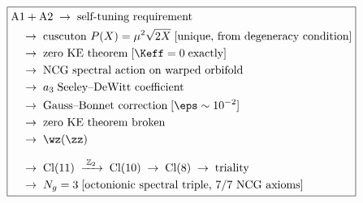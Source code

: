 %

\begin{equation}
\label{eq:1-chain-final}
\boxed{
\begin{aligned}
&\mathrm{A1 + A2} \;\to\; \text{self-tuning requirement} \\
&\quad\to\; \text{cuscuton } P(X) = \mu^2\sqrt{2X}\; [\text{unique, from degeneracy condition}] \\
&\quad\to\; \text{zero KE theorem}\; [\Keff = 0\;\text{exactly}] \\
&\quad\to\; \text{NCG spectral action on warped orbifold} \\
&\quad\to\; a_3\;\text{Seeley--DeWitt coefficient} \\
&\quad\to\; \text{Gauss--Bonnet correction}\; [\eps \sim 10^{-2}] \\
&\quad\to\; \text{zero KE theorem broken} \\
&\quad\to\; \wz(\zz) \\[6pt]
&\quad\to\; \mathrm{Cl}(11) \;\xrightarrow{\;\mathbb{Z}_2\;}\;
            \mathrm{Cl}(10) \;\to\; \mathrm{Cl}(8) \;\to\; \text{triality} \\
&\quad\to\; N_g = 3\; [\text{octonionic spectral triple, 7/7 NCG axioms}]
\end{aligned}
}
\end{equation}


%

